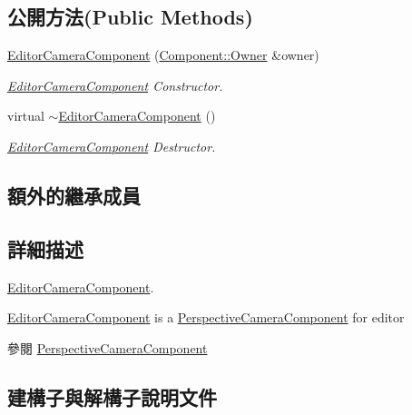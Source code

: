 \subsection*{公開方法(Public Methods)}
\begin{DoxyCompactItemize}
\item 
\hyperlink{class_magnum_1_1_editor_camera_component_ae1825046473d07250ca75e000442c206}{Editor\+Camera\+Component} (\hyperlink{class_magnum_1_1_component_1_1_owner}{Component\+::\+Owner} \&owner)
\begin{DoxyCompactList}\small\item\em \hyperlink{class_magnum_1_1_editor_camera_component}{Editor\+Camera\+Component} Constructor. \end{DoxyCompactList}\item 
virtual \hyperlink{class_magnum_1_1_editor_camera_component_a25a0c9cdfa8ba1bb7aef1fc69435ab9f}{$\sim$\+Editor\+Camera\+Component} ()
\begin{DoxyCompactList}\small\item\em \hyperlink{class_magnum_1_1_editor_camera_component}{Editor\+Camera\+Component} Destructor. \end{DoxyCompactList}\end{DoxyCompactItemize}
\subsection*{額外的繼承成員}


\subsection{詳細描述}
\hyperlink{class_magnum_1_1_editor_camera_component}{Editor\+Camera\+Component}. 

\hyperlink{class_magnum_1_1_editor_camera_component}{Editor\+Camera\+Component} is a \hyperlink{class_magnum_1_1_perspective_camera_component}{Perspective\+Camera\+Component} for editor \begin{DoxySeeAlso}{參閱}
\hyperlink{class_magnum_1_1_perspective_camera_component}{Perspective\+Camera\+Component} 
\end{DoxySeeAlso}


\subsection{建構子與解構子說明文件}
